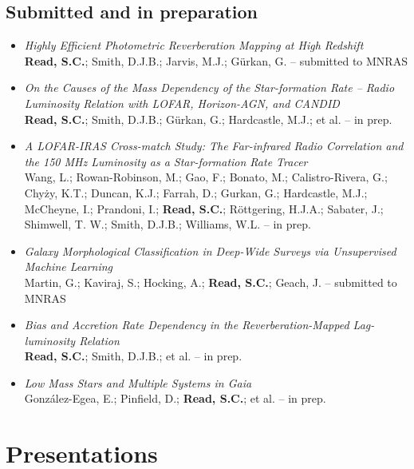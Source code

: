 \documentclass[letterpaper]{twentysecondcv} %
\begin{document}
\begin{publications}
\subsection{Submitted and in preparation}
\begin{itemize}
     \item \textit{Highly Efficient Photometric Reverberation Mapping at High Redshift}\\{\small \textbf{Read, S.C.}; Smith, D.J.B.; Jarvis, M.J.; Gürkan, G. -- submitted to MNRAS}
 \item \textit{On the Causes of the Mass Dependency of the Star-formation Rate -- Radio
Luminosity Relation with LOFAR, Horizon-AGN, and CANDID}\\{\small \textbf{Read, S.C.}; Smith, D.J.B.; Gürkan, G.; Hardcastle, M.J.; et al. -- in prep.}
 \item \textit{A LOFAR-IRAS Cross-match Study: The Far-infrared Radio Correlation and
the 150 MHz Luminosity as a Star-formation Rate Tracer}\\{\small Wang, L.; Rowan-Robinson, M.; Gao, F.; Bonato, M.; Calistro-Rivera, G.;
Chyży, K.T.; Duncan, K.J.; Farrah, D.; Gurkan, G.; Hardcastle, M.J.;
McCheyne, I.; Prandoni, I.; \textbf{Read, S.C.}; Röttgering, H.J.A.;
Sabater, J.; Shimwell, T. W.; Smith, D.J.B.; Williams, W.L. -- in prep.}
 \item \textit{Galaxy Morphological Classification in Deep-Wide Surveys via
Unsupervised Machine Learning}\\{\small Martin, G.; Kaviraj, S.; Hocking, A.; \textbf{Read, S.C.}; Geach, J. -- submitted to MNRAS}
 \item \textit{Bias and Accretion Rate Dependency in the Reverberation-Mapped
Lag-luminosity Relation}\\{\small \textbf{Read, S.C.}; Smith, D.J.B.; et al. -- in prep.}
 \item \textit{Low Mass Stars and Multiple Systems in Gaia}\\{\small González-Egea, E.; Pinfield, D.; \textbf{Read, S.C.}; et al. -- in prep.}
\end{itemize}

\section{Presentations}
\begin{twentyfull}
\end{twentyfull}
\end{publications}
\end{document}
